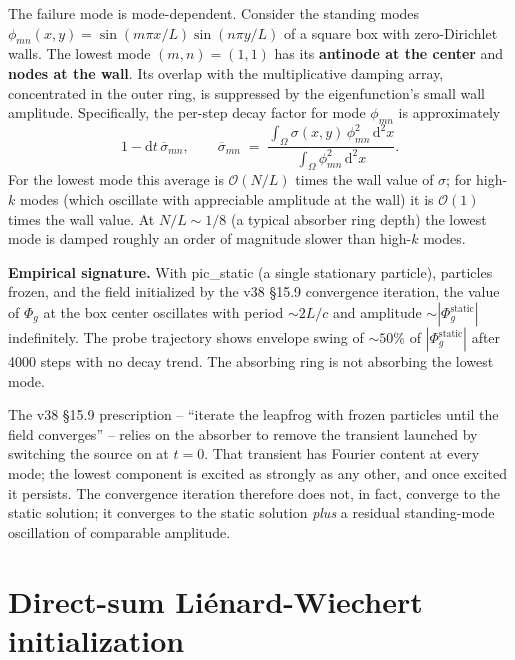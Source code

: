 \documentclass[11pt,a4paper]{article}
\newcommand{\Phig}{\Phi_g}
\newcommand{\order}[1]{\mathcal{O}(#1)}
\newcommand{\dd}{\mathrm{d}}
\begin{document}
The failure mode is mode-dependent.  Consider the standing modes
$\phi_{mn}(x,y) = \sin(m\pi x/L)\sin(n\pi y/L)$ of a square box with
zero-Dirichlet walls.  The lowest mode $(m,n) = (1,1)$ has its
\textbf{antinode at the center} and \textbf{nodes at the wall}.  Its
overlap with the multiplicative damping array, concentrated in the
outer ring, is suppressed by the eigenfunction's small wall
amplitude.  Specifically, the per-step decay factor for mode
$\phi_{mn}$ is approximately
\begin{equation}
  1 - \dd t\,\overline{\sigma}_{mn},
  \qquad
  \overline{\sigma}_{mn}
     \;=\;
     \frac{\int_\Omega \sigma(x,y)\,\phi_{mn}^2\,\dd^2 x}
          {\int_\Omega \phi_{mn}^2\,\dd^2 x}.
\end{equation}
For the lowest mode this average is $\order{N/L}$ times the wall value
of $\sigma$; for high-$k$ modes (which oscillate with appreciable
amplitude at the wall) it is $\order{1}$ times the wall value.  At
$N/L \sim 1/8$ (a typical absorber ring depth) the lowest mode is
damped roughly an order of magnitude slower than high-$k$ modes.

\textbf{Empirical signature.}  With pic\_static (a single stationary
particle), particles frozen, and the field initialized by the v38
\S 15.9 convergence iteration, the value of $\Phig$ at the box center
oscillates with period $\sim 2L/c$ and amplitude $\sim |\Phig^\text{static}|$
indefinitely.  The probe trajectory shows envelope swing of
$\sim 50\%$ of $|\Phig^\text{static}|$ after 4000 steps with no decay
trend.  The absorbing ring is not absorbing the lowest mode.

\vspace{0.5em}
The v38 \S 15.9 prescription -- ``iterate the leapfrog with frozen
particles until the field converges'' -- relies on the absorber to
remove the transient launched by switching the source on at $t=0$.
That transient has Fourier content at every mode; the lowest
component is excited as strongly as any other, and once excited it
persists.  The convergence iteration therefore does not, in fact,
converge to the static solution; it converges to the static solution
\emph{plus} a residual standing-mode oscillation of comparable
amplitude.

\section{Direct-sum Liénard-Wiechert initialization}
\label{sec:lw_init}
\end{document}
